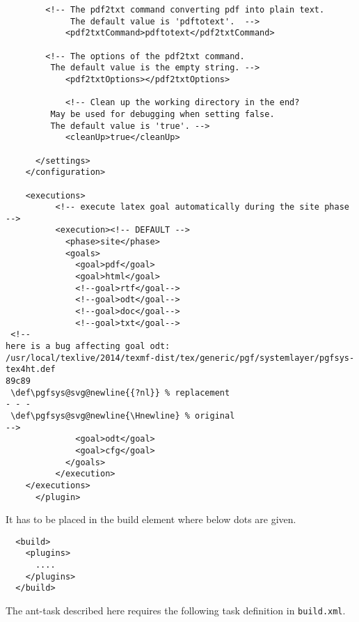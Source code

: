 \documentclass[12pt]{article}
\begin{document}
\begin{lstlisting}
	    <!-- The pdf2txt command converting pdf into plain text. 
	    	 The default value is 'pdftotext'.  -->
            <pdf2txtCommand>pdftotext</pdf2txtCommand>

	    <!-- The options of the pdf2txt command. 
		 The default value is the empty string. -->
            <pdf2txtOptions></pdf2txtOptions>

            <!-- Clean up the working directory in the end? 
		 May be used for debugging when setting false. 
		 The default value is 'true'. -->
            <cleanUp>true</cleanUp>

 	  </settings>
	</configuration>

	<executions>
          <!-- execute latex goal automatically during the site phase -->
          <execution><!-- DEFAULT -->
            <phase>site</phase>
            <goals>
              <goal>pdf</goal>
              <goal>html</goal>
              <!--goal>rtf</goal-->
              <!--goal>odt</goal-->
              <!--goal>doc</goal-->
              <!--goal>txt</goal-->
 <!--
here is a bug affecting goal odt: 
/usr/local/texlive/2014/texmf-dist/tex/generic/pgf/systemlayer/pgfsys-tex4ht.def
89c89
 \def\pgfsys@svg@newline{{?nl}} % replacement 
- - -
 \def\pgfsys@svg@newline{\Hnewline} % original 
-->
              <goal>odt</goal>
              <goal>cfg</goal>
            </goals>
          </execution>
	</executions>
      </plugin>
\end{lstlisting}

It has to be placed in the build element where below dots are given. 

\begin{lstlisting}
  <build>
    <plugins>
      ....
    </plugins>
  </build>
\end{lstlisting}


The ant-task described here 
requires the following task definition in {\tt build.xml}. 
\end{document}

